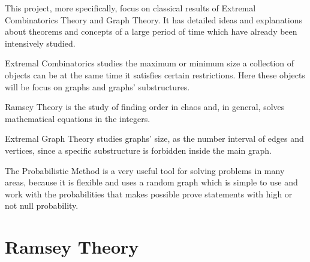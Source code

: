 \documentclass[12pt,twoside,a4paper]{book}
\numberwithin{equation}{section}
\theoremstyle{remark}
\begin{document}
This project, more specifically, focus on classical results of Extremal Combinatorics Theory and Graph Theory. It has detailed ideas and explanations about theorems and concepts of a large period of time which have already been intensively studied.

Extremal Combinatorics studies the maximum or minimum size a collection of objects can be at the same time it satisfies certain restrictions. Here these objects will be focus on graphs and graphs' substructures. 

Ramsey Theory is the study of finding order in chaos and, in general, solves mathematical equations in the integers.

Extremal Graph Theory studies graphs' size, as the number interval of edges and vertices, since a specific substructure is forbidden inside the main graph.

The Probabilistic Method is a very useful tool for solving problems in many areas, because it is flexible and uses a random graph which is simple to use and work with the probabilities that makes possible prove statements with high or not null probability.










\chapter{Ramsey Theory}
\end{document}
